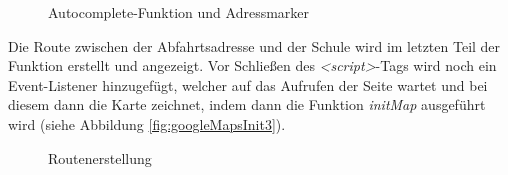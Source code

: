 \begin{figure}[!h]
	\caption{Autocomplete-Funktion und Adressmarker}
	\label{fig:googleMapsInit2}
\end{figure}

Die Route zwischen der Abfahrtsadresse und der Schule wird im letzten Teil der Funktion erstellt und angezeigt. Vor Schließen des \textit{<script>}-Tags wird noch ein Event-Listener hinzugefügt, welcher auf das Aufrufen der Seite wartet und bei diesem dann die Karte zeichnet, indem dann die Funktion \textit{initMap} ausgeführt wird (siehe Abbildung \vref{fig:googleMapsInit3}).

\begin{figure}[!h]
	\caption{Routenerstellung}
	\label{fig:googleMapsInit3}
\end{figure}

